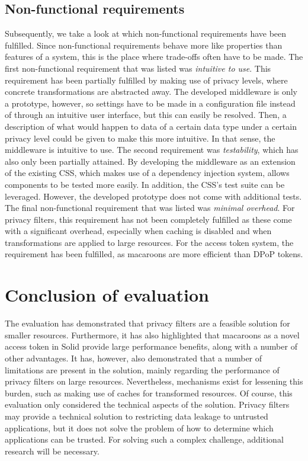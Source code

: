 \subsection{Non-functional requirements}
Subsequently, we take a look at which non-functional requirements have been fulfilled. Since non-functional requirements behave more like properties than features of a system, this is the place where trade-offs often have to be made. The first non-functional requirement that was listed was \textit{intuitive to use}. This requirement has been partially fulfilled by making use of privacy levels, where concrete transformations are abstracted away. The developed middleware is only a prototype, however, so settings have to be made in a configuration file instead of through an intuitive user interface, but this can easily be resolved. Then, a description of what would happen to data of a certain data type under a certain privacy level could be given to make this more intuitive. In that sense, the middleware is intuitive to use. The second requirement was \textit{testability}, which has also only been partially attained. By developing the middleware as an extension of the existing \gls{CSS}, which makes use of a dependency injection system, allows components to be tested more easily. In addition, the \gls{CSS}'s test suite can be leveraged. However, the developed prototype does not come with additional tests. The final non-functional requirement that was listed was \textit{minimal overhead}. For privacy filters, this requirement has not been completely fulfilled as these come with a significant overhead, especially when caching is disabled and when transformations are applied to large resources. For the access token system, the requirement has been fulfilled, as macaroons are more efficient than \gls{DPoP} tokens.

\section{Conclusion of evaluation}
The evaluation has demonstrated that privacy filters are a feasible solution for smaller resources. Furthermore, it has also highlighted that macaroons as a novel access token in Solid provide large performance benefits, along with a number of other advantages. It has, however, also demonstrated that a number of limitations are present in the solution, mainly regarding the performance of privacy filters on large resources. Nevertheless, mechanisms exist for lessening this burden, such as making use of caches for transformed resources. Of course, this evaluation only considered the technical aspects of the solution. Privacy filters may provide a technical solution to restricting data leakage to untrusted applications, but it does not solve the problem of how to determine which applications can be trusted. For solving such a complex challenge, additional research will be necessary. 
